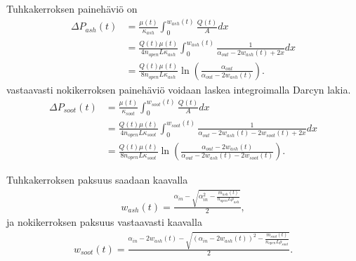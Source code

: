 Tuhkakerroksen painehäviö on
\begin{align}\label{eq:deltaP_ash}
    \Delta P_{ash}(t) &= \frac{\mu(t)}{\kappa_{ash}} \int_0^{w_{ash}(t)}  \frac{Q(t)}{A}dx 
    \nonumber\\ &= \frac{Q(t) \mu(t) }{4 n_{open} L \kappa_{ash}} \int_0^{w_{ash}(t)}  \frac{1}{\alpha_{out}-2w_{ash}(t)+2x}dx 
    \nonumber \\ &= \frac{Q(t)\mu(t)}{8 n_{open} L \kappa_{ash}}\ln\left(\frac{\alpha_{out}}{\alpha_{out}-2w_{ash}(t)}\right).
\end{align}
vastaavasti nokikerroksen painehäviö voidaan laskea integroimalla Darcyn lakia. 
\begin{align}\label{eq:deltaP_soot}
    \Delta P_{soot}(t) &= \frac{\mu(t)}{\kappa_{soot}} \int_{0}^{w_{soot}(t)}  \frac{Q(t)}{A}dx 
    \nonumber\\    &= \frac{Q(t) \mu(t) }{4 n_{open} L \kappa_{soot}} \int_{0}^{w_{soot}(t)}  \frac{1}{\alpha_{out}-2w_{ash}(t)-2w_{soot}(t)+2x}dx 
    \nonumber \\ &= \frac{Q(t)\mu(t)}{8 n_{open} L \kappa_{soot}}\ln\left(\frac{\alpha_{out}-2w_{ash}(t)}{\alpha_{out}-2w_{ash}(t)-2w_{soot}(t)}\right).
\end{align}

Tuhkakerroksen paksuus saadaan kaavalla
\begin{align}\label{eq:deltaP_wash}
    w_{ash}(t) = \frac{\alpha_{in} - \sqrt{\alpha_{in}^2 - \frac{m_{ash}(t)}{ n_{open} L \rho_{ash}}}}{2},
\end{align}
ja nokikerroksen paksuus vastaavasti kaavalla
\begin{align}\label{eq:deltaP_wsoot}
    w_{soot}(t)= \frac{\alpha_{in}-2w_{ash}(t) - \sqrt{(\alpha_{in}-2w_{ash}(t))^2 - \frac{m_{soot}(t)}{ n_{open} L \rho_{soot}}}}{2}.
\end{align}